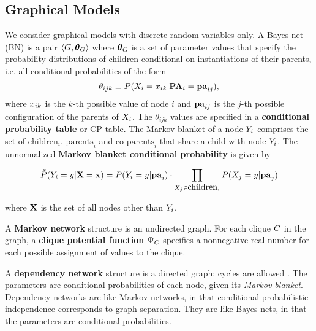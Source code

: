 \documentclass[twoside,leqno,twocolumn]{article}
\begin{document}
\subsection{Graphical Models} We consider graphical models with discrete random variables only. 
A Bayes net (BN) is a pair
$\langle{G,\boldsymbol{\theta}_G}\rangle$ where $\boldsymbol{\theta}_G$ is a set of parameter values that specify the  probability distributions of children conditional on instantiations of their parents, i.e. all conditional probabilities of the form
\[\theta_{ijk} \equiv P(X_{i}=x_{ik}|\mathbf{PA}_{i}=\mathbf{pa}_{ij}),\] where $x_{ik}$ is the $k$-th possible value of node $i$ and $\mathbf{pa}_{ij}$ is the $j$-th possible configuration of the parents of $X_{i}$. The $\theta_{ijk}$ values are specified in a \textbf{conditional probability table} %
or CP-table. The Markov blanket of a node $Y_{i}$ comprises the set of $\mbox{children}_{i}$, $\mbox{parents}_{i}$ and $\mbox{co-parents}_{i}$ that share a child with node $Y_{i}$. The unnormalized \textbf{Markov blanket conditional probability} \cite[Ch.14.5.2]{Russell2010} is given by 

\begin{equation} \label{eq:bn-mb}
\tilde{P}(Y_{i} = y|\mathbf{X} = \mathbf{x}) = \\ P(Y_{i} = y|\mathbf{pa}_{i}) \cdot \prod_{X_{j} \in \mbox{children}_{i}} P(X_{j} = y|\mathbf{pa}_{j})
\end{equation}

where $\mathbf{X}$ is the set of all nodes other than $Y_{i}$.

A \textbf{Markov network} structure is an undirected graph. For each clique $C$ in the graph, a \textbf{clique potential function} $\Psi_{C}$ specifies a nonnegative real number for each possible assignment of values to the clique. 

A \textbf{dependency network} structure is a directed graph; cycles are allowed \cite{Heckerman2000,bib:jensen-chapter,Natarajan2012}. The parameters are conditional probabilities of each node, given its {\em Markov blanket}.
 Dependency networks are like Markov networks, in that conditional probabilistic independence corresponds to graph separation. They are like Bayes nets, in that the parameters are conditional probabilities.
\end{document}

